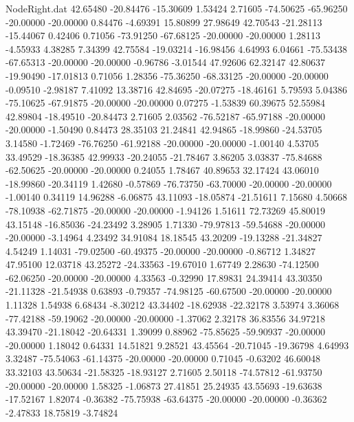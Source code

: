 \begin{filecontents}{NodeRight.dat}
  42.65480  -20.84476  -15.30609     1.53424    2.71605  -74.50625  -65.96250  -20.00000  -20.00000    0.84476   -4.69391   15.80899   27.98649
  42.70543  -21.28113  -15.44067     0.42406    0.71056  -73.91250  -67.68125  -20.00000  -20.00000    1.28113   -4.55933    4.38285    7.34399
  42.75584  -19.03214  -16.98456     4.64993    6.04661  -75.53438  -67.65313  -20.00000  -20.00000   -0.96786   -3.01544   47.92606   62.32147
  42.80637  -19.90490  -17.01813     0.71056    1.28356  -75.36250  -68.33125  -20.00000  -20.00000   -0.09510   -2.98187    7.41092   13.38716
  42.84695  -20.07275  -18.46161     5.79593    5.04386  -75.10625  -67.91875  -20.00000  -20.00000    0.07275   -1.53839   60.39675   52.55984
  42.89804  -18.49510  -20.84473     2.71605    2.03562  -76.52187  -65.97188  -20.00000  -20.00000   -1.50490    0.84473   28.35103   21.24841
  42.94865  -18.99860  -24.53705     3.14580   -1.72469  -76.76250  -61.92188  -20.00000  -20.00000   -1.00140    4.53705   33.49529  -18.36385
  42.99933  -20.24055  -21.78467     3.86205    3.03837  -75.84688  -62.50625  -20.00000  -20.00000    0.24055    1.78467   40.89653   32.17424
  43.06010  -18.99860  -20.34119     1.42680   -0.57869  -76.73750  -63.70000  -20.00000  -20.00000   -1.00140    0.34119   14.96288   -6.06875
  43.11093  -18.05874  -21.51611     7.15680    4.50668  -78.10938  -62.71875  -20.00000  -20.00000   -1.94126    1.51611   72.73269   45.80019
  43.15148  -16.85036  -24.23492     3.28905    1.71330  -79.97813  -59.54688  -20.00000  -20.00000   -3.14964    4.23492   34.91084   18.18545
  43.20209  -19.13288  -21.34827     4.54249    1.14031  -79.02500  -60.49375  -20.00000  -20.00000   -0.86712    1.34827   47.95100   12.03718
  43.25272  -24.33563  -19.67010     1.67749    2.28630  -74.12500  -62.06250  -20.00000  -20.00000    4.33563   -0.32990   17.89831   24.39414
  43.30350  -21.11328  -21.54938     0.63893   -0.79357  -74.98125  -60.67500  -20.00000  -20.00000    1.11328    1.54938    6.68434   -8.30212
  43.34402  -18.62938  -22.32178     3.53974    3.36068  -77.42188  -59.19062  -20.00000  -20.00000   -1.37062    2.32178   36.83556   34.97218
  43.39470  -21.18042  -20.64331     1.39099    0.88962  -75.85625  -59.90937  -20.00000  -20.00000    1.18042    0.64331   14.51821    9.28521
  43.45564  -20.71045  -19.36798     4.64993    3.32487  -75.54063  -61.14375  -20.00000  -20.00000    0.71045   -0.63202   46.60048   33.32103
  43.50634  -21.58325  -18.93127     2.71605    2.50118  -74.57812  -61.93750  -20.00000  -20.00000    1.58325   -1.06873   27.41851   25.24935
  43.55693  -19.63638  -17.52167     1.82074   -0.36382  -75.75938  -63.64375  -20.00000  -20.00000   -0.36362   -2.47833   18.75819   -3.74824

\end{filecontents}

